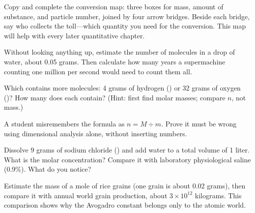 \begin{sikaoti}
\item Copy and complete the conversion map: three boxes for mass, amount of substance, and particle number, joined by four arrow bridges. Beside each bridge, say who collects the toll---which quantity you need for the conversion. This map will help with every later quantitative chapter.
\item Without looking anything up, estimate the number of molecules in a drop of water, about 0.05 grams. Then calculate how many years a supermachine counting one million per second would need to count them all.
\item Which contains more molecules: 4 grams of hydrogen () or 32 grams of oxygen ()? How many does each contain? (Hint: first find molar masses; compare $n$, not mass.)
\item A student misremembers the formula as $n=M\div m$. Prove it must be wrong using dimensional analysis alone, without inserting numbers.
\item Dissolve 9 grams of sodium chloride () and add water to a total volume of 1 liter. What is the molar concentration? Compare it with laboratory physiological saline ($0.9\%$). What do you notice?
\item Estimate the mass of a mole of rice grains (one grain is about 0.02 grams), then compare it with annual world grain production, about $3\times 10^{12}$ kilograms. This comparison shows why the Avogadro constant belongs only to the atomic world.
\end{sikaoti}

